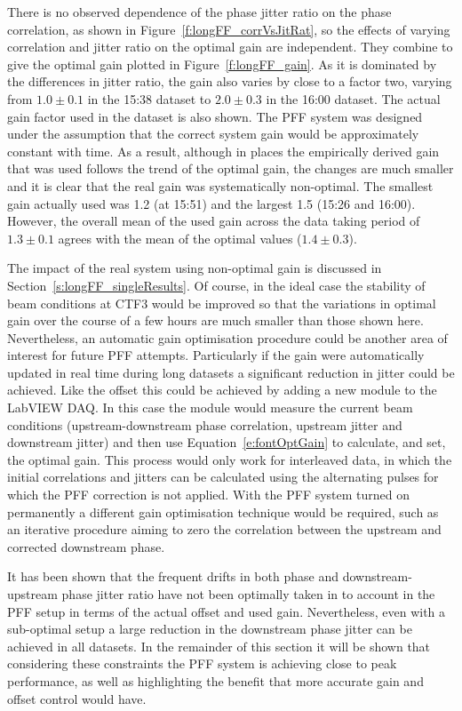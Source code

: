 There is no observed dependence of the phase jitter ratio on the phase correlation, as shown in Figure~\ref{f:longFF_corrVsJitRat}, so the effects of varying correlation and jitter ratio on the optimal gain are independent. They combine to give the optimal gain plotted in Figure~\ref{f:longFF_gain}. As it is dominated by the differences in jitter ratio, the gain also varies by close to a factor two, varying from \(1.0\pm0.1\) in the 15:38 dataset to \(2.0\pm0.3\) in the 16:00 dataset. The actual gain factor used in the dataset is also shown.
The PFF system was designed under the assumption that the correct system gain would be approximately constant with time.
As a result, although in places the empirically derived gain that was used follows the trend of the optimal gain, the changes are much smaller and it is clear that the real gain was systematically non-optimal. 
The smallest gain actually used was 1.2 (at 15:51) and the largest 1.5 (15:26 and 16:00). However, the overall mean of the used gain across the data taking period of \(1.3\pm0.1\) agrees with the mean of the optimal values (\(1.4\pm0.3\)). 

The impact of the real system using non-optimal gain is discussed in Section~\ref{s:longFF_singleResults}. Of course, in the ideal case the stability of beam conditions at CTF3 would be improved so that the variations in optimal gain over the course of a few hours are much smaller than those shown here. Nevertheless, an automatic gain optimisation procedure could be another area of interest for future PFF attempts. Particularly if the gain were automatically updated in real time during long datasets a significant reduction in jitter could be achieved. Like the offset this could be achieved by adding a new module to the LabVIEW DAQ. In this case the module would measure the current beam conditions (upstream-downstream phase correlation, upstream jitter and downstream jitter) and then use Equation~\ref{e:fontOptGain} to calculate, and set, the optimal gain. This process would only work for interleaved data, in which the initial correlations and jitters can be calculated using the alternating pulses for which the PFF correction is not applied. With the PFF system turned on permanently a different gain optimisation technique would be required, such as an iterative procedure aiming to zero the correlation between the upstream and corrected downstream phase.


It has been shown that the frequent drifts in both phase and downstream-upstream phase jitter ratio have not been optimally taken in to account in the PFF setup in terms of the actual offset and used gain. Nevertheless, even with a sub-optimal setup a large reduction in the downstream phase jitter can be achieved in all datasets. In the remainder of this section it will be shown that considering these constraints the PFF system is achieving close to peak performance, as well as highlighting the benefit that more accurate gain and offset control would have.


